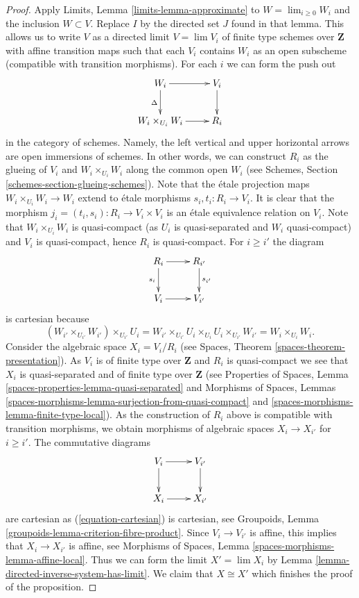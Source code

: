 \begin{proof}
\medskip\noindent
Apply Limits, Lemma \ref{limits-lemma-approximate} to
$W = \lim_{i \geq 0} W_i$ and the inclusion $W \subset V$. Replace $I$
by the directed set $J$ found in that lemma. This allows us
to write $V$ as a directed limit $V = \lim V_i$ of finite type schemes over
$\mathbf{Z}$ with affine transition maps such that each $V_i$ contains
$W_i$ as an open subscheme (compatible with transition morphisms).
For each $i$ we can form the push out
$$
\xymatrix{
W_i \ar[r] \ar[d]_\Delta & V_i \ar[d] \\
W_i \times_{U_i} W_i \ar[r] & R_i
}
$$
in the category of schemes. Namely, the left vertical and upper horizontal
arrows are open immersions of schemes. In other words, we can construct
$R_i$ as the glueing of $V_i$ and $W_i \times_{U_i} W_i$ along the common open
$W_i$ (see Schemes, Section \ref{schemes-section-glueing-schemes}). Note that
the \'etale projection maps $W_i \times_{U_i} W_i \to W_i$ extend
to \'etale morphisms $s_i, t_i : R_i \to V_i$. It is clear that the
morphism $j_i = (t_i, s_i) : R_i \to V_i \times V_i$ is an \'etale
equivalence relation on $V_i$. Note that $W_i \times_{U_i} W_i$ is
quasi-compact (as $U_i$ is quasi-separated and $W_i$ quasi-compact)
and $V_i$ is quasi-compact, hence $R_i$ is quasi-compact. For
$i \geq i'$ the diagram
\begin{equation}
\label{equation-cartesian}
\vcenter{
\xymatrix{
R_i \ar[r] \ar[d]_{s_i} & R_{i'} \ar[d]^{s_{i'}} \\
V_i \ar[r] & V_{i'}
}
}
\end{equation}
is cartesian because
$$
(W_{i'} \times_{U_{i'}} W_{i'}) \times_{U_{i'}} U_i =
W_{i'} \times_{U_{i'}} U_i \times_{U_i} U_i \times_{U_{i'}} W_{i'} =
W_i \times_{U_i} W_i.
$$
Consider the algebraic space $X_i = V_i/R_i$ (see
Spaces, Theorem \ref{spaces-theorem-presentation}).
As $V_i$ is of finite type over $\mathbf{Z}$ and $R_i$ is quasi-compact
we see that $X_i$ is quasi-separated and of finite type over $\mathbf{Z}$
(see
Properties of Spaces, Lemma \ref{spaces-properties-lemma-quasi-separated}
and
Morphisms of Spaces, Lemmas
\ref{spaces-morphisms-lemma-surjection-from-quasi-compact} and
\ref{spaces-morphisms-lemma-finite-type-local}).
As the construction of $R_i$ above is compatible
with transition morphisms, we obtain morphisms of algebraic spaces
$X_i \to X_{i'}$ for $i \geq i'$. The commutative diagrams
$$
\xymatrix{
V_i \ar[r] \ar[d] & V_{i'} \ar[d] \\
X_i \ar[r] & X_{i'}
}
$$
are cartesian as (\ref{equation-cartesian}) is cartesian, see
Groupoids, Lemma \ref{groupoids-lemma-criterion-fibre-product}.
Since $V_i \to V_{i'}$ is affine, this implies that $X_i \to X_{i'}$
is affine, see
Morphisms of Spaces, Lemma \ref{spaces-morphisms-lemma-affine-local}.
Thus we can form the limit $X' = \lim X_i$ by
Lemma \ref{lemma-directed-inverse-system-has-limit}.
We claim that $X \cong X'$ which finishes the proof of the proposition.


\end{proof}
